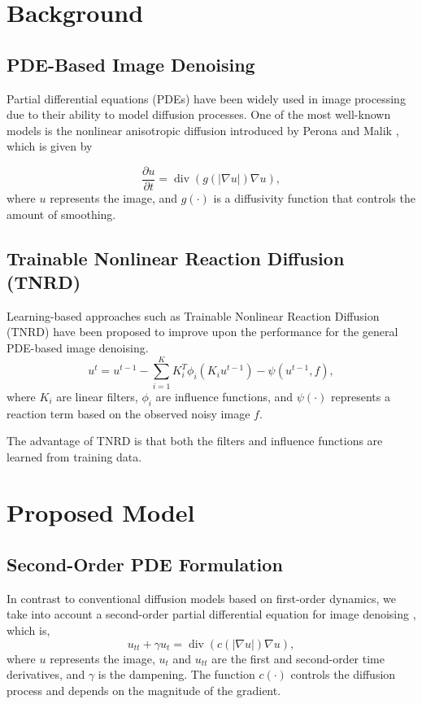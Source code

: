 \documentclass[conference]{IEEEtran}
\begin{document}
\section{Background}

\subsection{PDE-Based Image Denoising}

Partial differential equations (PDEs) have been widely used in image processing due to their ability to model diffusion processes. One of the most well-known models is the nonlinear anisotropic diffusion introduced by Perona and Malik \cite{perona1990}, which is given by

\begin{equation}
    \frac{\partial u}{\partial t} = \operatorname{div}(g(|\nabla u|)\nabla u),
\end{equation}
where $u$ represents the image, and $g(\cdot)$ is a diffusivity function that controls the amount of smoothing.

\subsection{Trainable Nonlinear Reaction Diffusion (TNRD)}

Learning-based approaches such as Trainable Nonlinear Reaction Diffusion (TNRD) \cite{chen2016tnrd} have been proposed to improve upon the performance for the general PDE-based image denoising.
\begin{equation}
u^{t} = u^{t-1} - \sum_{i=1}^{K} K_i^T \phi_i(K_i u^{t-1}) - \psi(u^{t-1}, f),
\end{equation}
where $K_i$ are linear filters, $\phi_i$ are influence functions, and $\psi(\cdot)$ represents a reaction term based on the observed noisy image $f$.

The advantage of TNRD is that both the filters and influence functions are learned from training data.

\section{Proposed Model}

\subsection{Second-Order PDE Formulation}

In contrast to conventional diffusion models based on first-order dynamics, we take into account a second-order partial differential equation for image denoising \cite{majee2020telegraph}, which is,
\begin{equation}
u_{tt} + \gamma u_t = \operatorname{div}(c(|\nabla u|)\nabla u),
\end{equation}
where $u$ represents the image, $u_t$ and $u_{tt}$ are the first and second-order time derivatives, and $\gamma$ is the dampening. The function $c(\cdot)$ controls the diffusion process and depends on the magnitude of the gradient.
\end{document}

